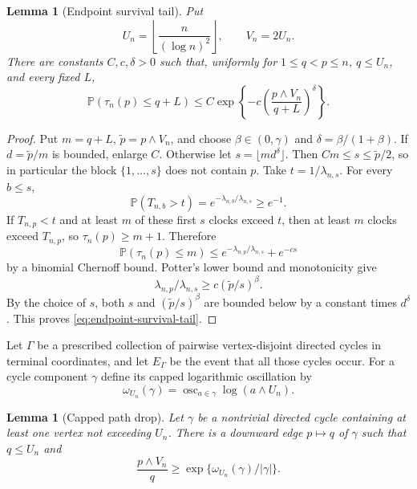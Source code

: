 \documentclass[11pt]{article}
\newtheorem{lemma}[theorem]{Lemma}
\theoremstyle{remark}
\newcommand{\Pp}{\mathbb P}
\begin{document}
\begin{lemma}[Endpoint survival tail]
\label{lem:endpoint-survival-tail}
Put
\[
        U_n=\left\lfloor\frac{n}{(\log n)^2}\right\rfloor,
        \qquad V_n=2U_n.
\]
There are constants $C,c,\delta>0$ such that, uniformly for
$1\le q<p\le n$, $q\le U_n$, and every fixed $L$,
\[
        \Pp(\tau_n(p)\le q+L)
        \le C\exp\left\{-c
        \left(\frac{p\wedge V_n}{q+L}\right)^\delta\right\}.
\tag{10.39}\label{eq:endpoint-survival-tail}
\]
\end{lemma}

\begin{proof}
Put $m=q+L$, $\widetilde p=p\wedge V_n$, and choose
$\beta\in(0,\gamma)$ and $\delta=\beta/(1+\beta)$.  If
$d=\widetilde p/m$ is bounded, enlarge $C$.  Otherwise let
$s=\lfloor m d^\delta\rfloor$.  Then $Cm\le s\le\widetilde p/2$, so in
particular the block $\{1,\ldots,s\}$ does not contain $p$.  Take
$t=1/\lambda_{n,s}$.  For every $b\le s$,
\[
        \Pp(T_{n,b}>t)=e^{-\lambda_{n,b}/\lambda_{n,s}}\ge e^{-1}.
\]
If $T_{n,p}<t$ and at least $m$ of these first $s$ clocks exceed $t$, then at
least $m$ clocks exceed $T_{n,p}$, so $\tau_n(p)\ge m+1$.  Therefore
\[
        \Pp(\tau_n(p)\le m)
        \le e^{-\lambda_{n,p}/\lambda_{n,s}}+e^{-cs}
\]
by a binomial Chernoff bound.  Potter's lower bound and monotonicity give
\[
        \lambda_{n,p}/\lambda_{n,s}
        \ge c(\widetilde p/s)^\beta.
\]
By the choice of $s$, both $s$ and $(\widetilde p/s)^\beta$ are bounded below
by a constant times $d^\delta$.  This proves
\eqref{eq:endpoint-survival-tail}.
\end{proof}

Let $\Gamma$ be a prescribed collection of pairwise vertex-disjoint directed
cycles in terminal coordinates, and let $E_\Gamma$ be the event that all those
cycles occur.  For a cycle component $\gamma$ define its capped logarithmic
oscillation by
\[
        \omega_{U_n}(\gamma)
        =\operatorname{osc}_{a\in\gamma}\log(a\wedge U_n).
\tag{10.40}\label{eq:capped-log-oscillation}
\]

\begin{lemma}[Capped path drop]
\label{lem:capped-path-drop}
Let $\gamma$ be a nontrivial directed cycle containing at least one vertex not
exceeding $U_n$.  There is a downward edge $p\mapsto q$ of $\gamma$ such that
$q\le U_n$ and
\[
        \frac{p\wedge V_n}{q}
        \ge\exp\{\omega_{U_n}(\gamma)/|\gamma|\}.
\tag{10.41}\label{eq:capped-path-drop}
\]
\end{lemma}
\end{document}
